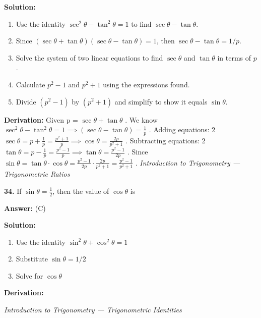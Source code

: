\documentclass[12pt,a4paper]{exam}
\newcommand{\fitmath}[1]{%
  \sbox{\schmathbox}{$\displaystyle #1$}%
  \ifdim\wd\schmathbox>\linewidth
    \resizebox{\linewidth}{!}{\usebox{\schmathbox}}%
  \else
    \usebox{\schmathbox}%
  \fi}
\begin{document}
\begin{questions}
\textbf{Solution:}
\begin{enumerate}
  \item Use the identity $\sec^2 \theta - \tan^2 \theta = 1$ to find $\sec \theta - \tan \theta$.
  \item Since $(\sec \theta + \tan \theta)(\sec \theta - \tan \theta) = 1$, then $\sec \theta - \tan \theta = 1/p$.
  \item Solve the system of two linear equations to find $\sec \theta$ and $\tan \theta$ in terms of $p$.
  \item Calculate $p^2 - 1$ and $p^2 + 1$ using the expressions found.
  \item Divide $(p^2 - 1)$ by $(p^2 + 1)$ and simplify to show it equals $\sin \theta$.
\end{enumerate}
\textbf{Derivation:}
Given  p = $\sec \theta + \tan \theta$ . We know  $\sec^2 \theta - \tan^2 \theta = 1 \implies (\sec \theta - \tan \theta) = \frac{1}{p}$ . Adding equations:  2$\sec \theta = p + \frac{1}{p} = \frac{p^2+1}{p} \implies \cos \theta = \frac{2p}{p^2+1}$ . Subtracting equations:  2$\tan \theta = p - \frac{1}{p} = \frac{p^2-1}{p} \implies \tan \theta = \frac{p^2-1}{2p}$ . Since  $\sin \theta = \tan \theta \cdot \cos \theta = \frac{p^2-1}{2p} \cdot \frac{2p}{p^2+1} = \frac{p^2-1}{p^2+1}$ .
\hfill \textit{Introduction to Trigonometry — Trigonometric Ratios}
\vspace{0.3cm}

\question \textbf{34.} If $\sin \theta = \frac{1}{2}$, then the value of $\cos \theta$ is

\textbf{Answer:}
(C)

\textbf{Solution:}
\begin{enumerate}
  \item Use the identity $\sin^2 \theta + \cos^2 \theta = 1$
  \item Substitute $\sin \theta = 1/2$
  \item Solve for $\cos \theta$
\end{enumerate}
\textbf{Derivation:}
\begin{center}
\fitmath{\begin{aligned}
\cos^2 \theta = 1 - (1/2)^2 = 1 - 1/4 = 3/4 \\
\implies \cos \theta = \frac{\sqrt{3}}{2}
\end{aligned}}
\end{center}
\hfill \textit{Introduction to Trigonometry — Trigonometric Identities}
\vspace{0.3cm}


\end{questions}
\end{document}
